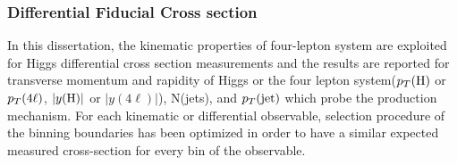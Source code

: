 \subsubsection{Differential Fiducial Cross section} \label{sec:Differential}

In this dissertation, the kinematic properties of four-lepton system are exploited for Higgs differential cross section measurements and the results are reported for transverse momentum and
rapidity of Higgs or the four lepton system($p_T({\rm H})$ or $p_T(4\ell)$, $|y({\rm H})|$ or $|y(4\ell)|$), N(jets), and $p_T({\rm jet})$ which probe the production mechanism.
For each kinematic or differential observable, selection procedure of the binning boundaries has been optimized in order to have a similar expected measured cross-section for every bin of the observable.

